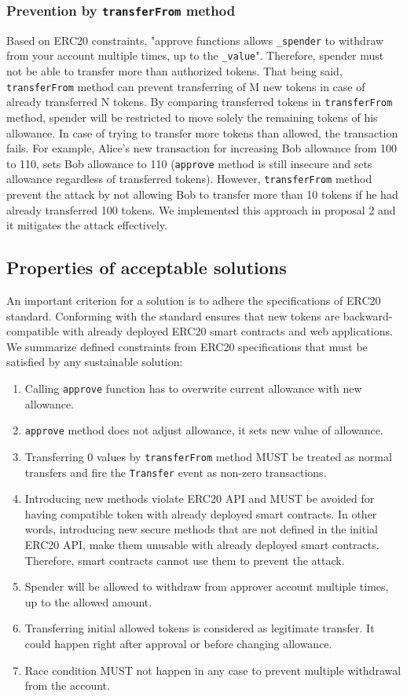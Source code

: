 \subsubsection*{Prevention by \texttt{transferFrom} method} Based on ERC20 constraints, "approve functions allows \texttt{\_spender} to withdraw from your account multiple times, up to the \texttt{\_value}". Therefore, spender must not be able to transfer more than authorized tokens. That being said, \texttt{transferFrom} method can prevent transferring of M new tokens in case of already transferred N tokens. By comparing transferred tokens in \texttt{transferFrom} method, spender will be restricted to move solely the remaining tokens of his allowance. In case of trying to transfer more tokens than allowed, the transaction fails. For example, Alice's new transaction for increasing Bob allowance from 100 to 110, sets Bob allowance to 110 (\texttt{approve} method is still insecure and sets allowance regardless of transferred tokens). However, \texttt{transferFrom} method prevent the attack by not allowing Bob to transfer more than 10 tokens if he had already transferred 100 tokens. We implemented this approach in proposal 2 and it mitigates the attack effectively.

\subsection{Properties of acceptable solutions}
An important criterion for a solution is to adhere the specifications of ERC20 standard. Conforming with the standard ensures that new tokens are backward-compatible with already deployed ERC20 smart contracts and web applications. We summarize defined constraints from ERC20 specifications \cite{Ref08} that must be satisfied by any sustainable solution:


\begin{enumerate}
	\item Calling \texttt{approve} function has to overwrite current allowance with new allowance.
	\item \texttt{approve} method does not adjust allowance, it sets new value of allowance.
	\item Transferring 0 values by \texttt{transferFrom} method MUST be treated as normal transfers and fire the \texttt{Transfer} event as non-zero transactions.
	\item Introducing new methods violate ERC20 API and MUST be avoided for having compatible token with already deployed smart contracts. In other words, introducing new secure methods that are not defined in the initial ERC20 API, make them unusable with already deployed smart contracts. Therefore, smart contracts cannot use them to prevent the attack.
	\item Spender will be allowed to withdraw from approver account multiple times, up to the allowed amount.
	\item Transferring initial allowed tokens is considered as legitimate transfer. It could happen right after approval or before changing allowance.
	\item Race condition MUST not happen in any case to prevent multiple withdrawal from the account.
\end{enumerate}